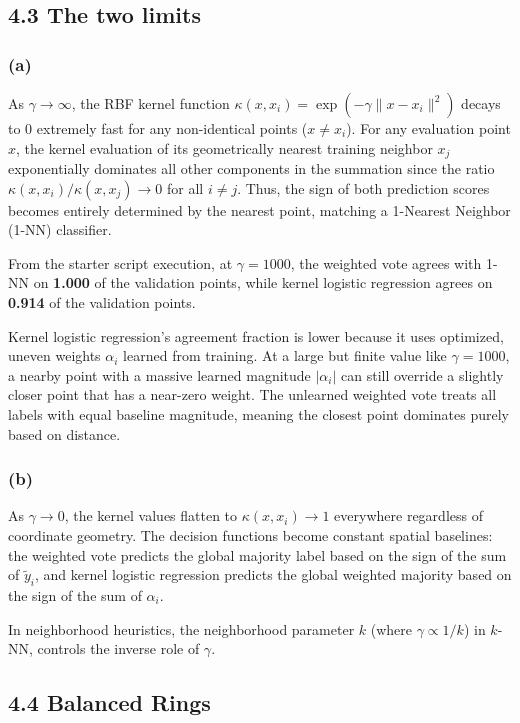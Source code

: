 \documentclass{article}
\begin{document}
\subsection*{4.3 The two limits}

\subsubsection*{(a)}
As $\gamma \to \infty$, the RBF kernel function $\kappa(x, x_i) = \exp(-\gamma \|x - x_i\|^2)$ decays to 0 extremely fast for any non-identical points ($x \neq x_i$). For any evaluation point $x$, the kernel evaluation of its geometrically nearest training neighbor $x_j$ exponentially dominates all other components in the summation since the ratio $\kappa(x, x_i) / \kappa(x, x_j) \to 0$ for all $i \neq j$. Thus, the sign of both prediction scores becomes entirely determined by the nearest point, matching a 1-Nearest Neighbor (1-NN) classifier.

From the starter script execution, at $\gamma = 1000$, the weighted vote agrees with 1-NN on \textbf{1.000} of the validation points, while kernel logistic regression agrees on \textbf{0.914} of the validation points. 

Kernel logistic regression's agreement fraction is lower because it uses optimized, uneven weights $\alpha_i$ learned from training. At a large but finite value like $\gamma = 1000$, a nearby point with a massive learned magnitude $|\alpha_i|$ can still override a slightly closer point that has a near-zero weight. The unlearned weighted vote treats all labels with equal baseline magnitude, meaning the closest point dominates purely based on distance.

\subsubsection*{(b)}
As $\gamma \to 0$, the kernel values flatten to $\kappa(x, x_i) \to 1$ everywhere regardless of coordinate geometry. The decision functions become constant spatial baselines: the weighted vote predicts the global majority label based on the sign of the sum of $\tilde{y}_i$, and kernel logistic regression predicts the global weighted majority based on the sign of the sum of $\alpha_i$. 

In neighborhood heuristics, the neighborhood parameter $k$ (where $\gamma \propto 1 / k$) in $k$-NN, controls the inverse role of $\gamma$.

\subsection*{4.4 Balanced Rings}
\end{document}
